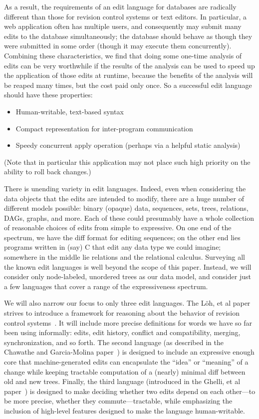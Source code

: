 \documentclass{article}
\newif\ifhighlightnew\highlightnewfalse
\newenvironment{newcontent}{\ifhighlightnew\color{green!55!black}[new]\fi}{\ifhighlightnew\color{black}\fi}
\begin{document}
\begin{newcontent}
As a result, the requirements of an edit language for databases are
radically different than those for revision control systems or text editors.
In particular, a web application often has multiple users, and consequently
may submit many edits to the database simultaneously; the database should
behave as though they were submitted in some order (though it may execute
them concurrently). Combining these characteristics, we find that doing some
one-time analysis of edits can be very worthwhile if the results of the
analysis can be used to speed up the application of those edits at runtime,
because the benefits of the analysis will be reaped many times, but the cost
paid only once. So a successful edit language should have these properties:
\begin{itemize}
    \item Human-writable, text-based syntax
    \item Compact representation for inter-program communication
    \item Speedy concurrent apply operation (perhaps via a helpful static
        analysis)
\end{itemize}
(Note that in particular this application may not place such high priority
on the ability to roll back changes.)
\end{newcontent}

There is unending variety in edit languages. Indeed, even when considering
the data objects that the edits are intended to modify, there are a huge
number of different models possible: binary (opaque) data, sequences,
sets, trees, relations, DAGs, graphs, and more. Each of these could
presumably have a whole collection of reasonable choices of edits from
simple to expressive. On one end of the spectrum, we have the diff format
for editing sequences; on the other end lies programs written in (say) C
that edit any data type we could imagine; somewhere in the middle lie
relations and the relational calculus. Surveying all the known edit
languages is well beyond the scope of this paper. Instead, we will consider
only node-labeled, unordered trees as our data model, and consider just a
few languages that cover a range of the expressiveness spectrum.

We will also narrow our focus to only three edit languages. The L\"oh, et al
paper strives to introduce a framework for reasoning about the behavior of
revision control systems~\cite{loh2007principled}. It will include more
precise definitions for words we have so far been using informally: edits,
edit history, conflict and compatibility, merging, synchronization, and so
forth. The second language (as described in the Chawathe and Garcia-Molina
paper~\cite{chawathe1997meaningful}) is designed to include an expressive
enough core that machine-generated edits can encapsulate the ``idea'' or
``meaning'' of a change while keeping tractable computation of a (nearly)
minimal diff between old and new trees.  Finally, the third language
(introduced in the Ghelli, et al paper~\cite{ghelli2006commutativity}) is
designed to make deciding whether two edits depend on each other---to be
more precise, whether they commute---tractable, while emphasizing the
inclusion of high-level features designed to make the language
human-writable.
\end{document}
